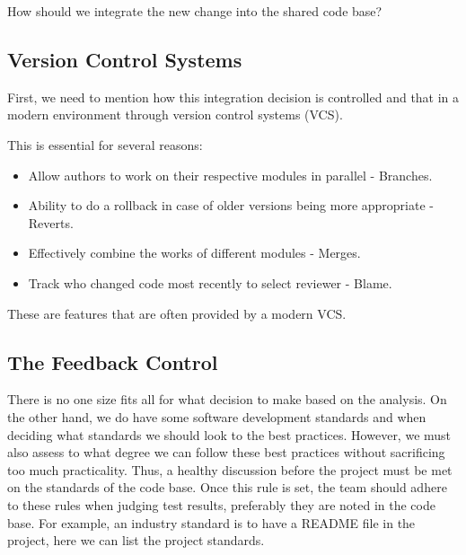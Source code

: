 \documentclass{article}
\begin{document}
    How should we integrate the new change into the shared code base?

\subsection{Version Control Systems}

First, we need to mention how this integration decision is controlled and that in a modern environment through version control systems (VCS). 

This is essential for several reasons: 

\begin{itemize}
    \item Allow authors to work on their respective modules in parallel - Branches.

    \item Ability to do a rollback in case of older versions being more appropriate - Reverts.

    \item Effectively combine the works of different modules - Merges. 

    \item Track who changed code most recently to select reviewer - Blame. \cite{sadowski_modern_2018}


\end{itemize}

These are features that are often provided by a modern VCS. \cite{noauthor_version_2018}

\newpage
\subsection{The Feedback Control}

There is no one size fits all for what decision to make based on the analysis. 
On the other hand, we do have some software development standards and when deciding what standards we should look to the best practices.
However, we must also assess to what degree we can follow these best practices without sacrificing too much practicality.
Thus, a healthy discussion before the project must be met on the standards of the code base. 
Once this rule is set, the team should adhere to these rules when judging test results, preferably they are noted in the code base.
For example, an industry standard is to have a README file in the project, here we can list the project standards.
\end{document}
